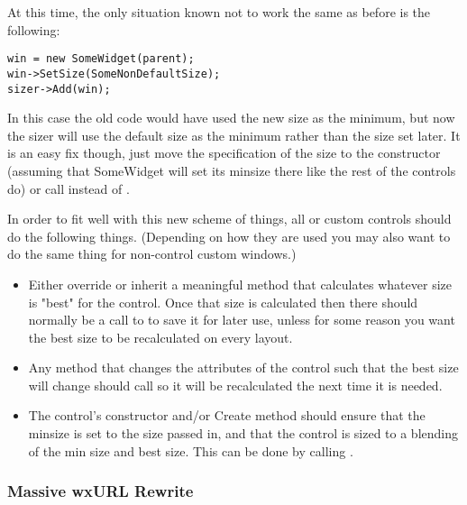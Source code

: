   At this time, the only situation known not to work the same as
  before is the following:

\begin{verbatim}
win = new SomeWidget(parent);
win->SetSize(SomeNonDefaultSize);
sizer->Add(win);
\end{verbatim}

  In this case the old code would have used the new size as the
  minimum, but now the sizer will use the default size as the minimum
  rather than the size set later.  It is an easy fix though, just move
  the specification of the size to the constructor (assuming that
  SomeWidget will set its minsize there like the rest of the controls
  do) or call  instead of .

  In order to fit well with this new scheme of things, all 
  or custom controls should do the following things.  (Depending on
  how they are used you may also want to do the same thing for
  non-control custom windows.)

\begin{itemize}\itemsep=0pt
\item Either override or inherit a meaningful  method
      that calculates whatever size is "best" for the control.  Once
      that size is calculated then there should normally be a call to
       to save it for later use, unless for some reason
      you want the best size to be recalculated on every layout.

\item Any method that changes the attributes of the control such that
      the best size will change should call  so it
      will be recalculated the next time it is needed.

\item The control's constructor and/or Create method should ensure
      that the minsize is set to the size passed in, and that the
      control is sized to a blending of the min size and best size.
      This can be done by calling .
\end{itemize}



\subsubsection{Massive wxURL Rewrite}\label{wxurlrewrite}

